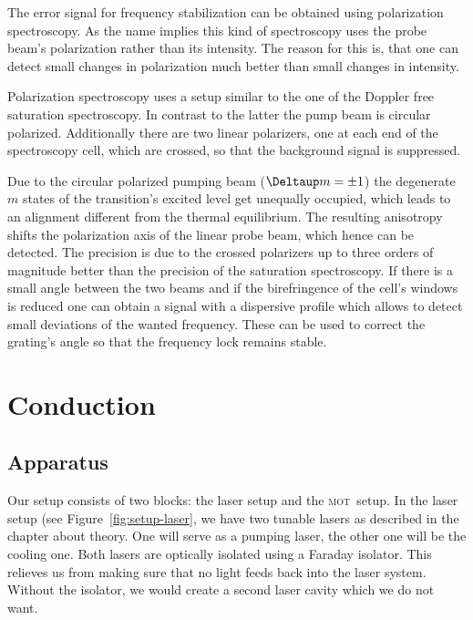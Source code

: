 \documentclass[11pt, english, fleqn, DIV=15, headinclude, BCOR=2cm]{scrreprt}
\newcommand\mot{\textsc{mot}}
\begin{document}
The error signal for frequency stabilization can be obtained using polarization
spectroscopy. As the name implies this kind of spectroscopy uses the probe
beam's polarization rather than its intensity. The reason for this is, that one
can detect small changes in polarization much better than small changes in
intensity.

Polarization spectroscopy uses a setup similar to the one of the Doppler free
saturation spectroscopy. In contrast to the latter the pump beam is circular
polarized. Additionally there are two linear polarizers, one at each
end of the spectroscopy cell, which are crossed, so that the background
signal is suppressed.

Due to the circular polarized pumping beam ($\Deltaup m = \pm1$) the degenerate
$m$ states of the transition's excited level get unequally occupied, which
leads to an alignment different from the thermal equilibrium. The resulting
anisotropy shifts the polarization axis of the linear probe beam, which hence
can be detected. The precision is due to the crossed polarizers up to three
orders of magnitude better than the precision of the saturation spectroscopy.
If there is a small angle between the two beams and if the birefringence of the
cell's windows is reduced one can obtain a signal with a dispersive profile
which allows to detect small deviations of the wanted frequency. These can be
used to correct the grating's angle so that the frequency lock remains stable.

\chapter{Conduction}

\section{Apparatus}

Our setup consists of two blocks: the laser setup and the \mot\ setup. In the
laser setup (see Figure~\ref{fig:setup-laser}, we have two tunable lasers as
described in the chapter about theory. One will serve as a pumping laser, the
other one will be the cooling one. Both lasers are optically isolated using a
Faraday isolator. This relieves us from making sure that no light feeds back
into the laser system. Without the isolator, we would create a second laser
cavity which we do not want.
\end{document}
